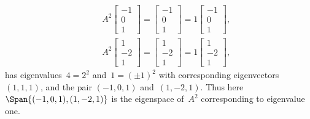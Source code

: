 \begin{example}
\begin{solution}
\begin{itemize}
\begin{eqnarray*}
\\&&A^2\begin{bmatrix} -1\\0\\1 \end{bmatrix}
=\begin{bmatrix} -1\\0\\1 \end{bmatrix}
=1\begin{bmatrix} -1\\0\\1 \end{bmatrix},
\\&&A^2\begin{bmatrix} 1\\-2\\1 \end{bmatrix}
=\begin{bmatrix} 1\\-2\\1 \end{bmatrix}
=1\begin{bmatrix} 1\\-2\\1 \end{bmatrix},
\end{eqnarray*}
has eigenvalues~\(4=2^2\) and~\(1=(\pm1)^2\) with corresponding eigenvectors \((1,1,1)\), and the pair \((-1,0,1)\) and~\((1,-2,1)\).
Thus here \(\Span\{(-1,0,1),(1,-2,1)\}\) is the eigenspace of~\(A^2\) corresponding to eigenvalue one.


\end{itemize}
\end{solution}
\end{example}
